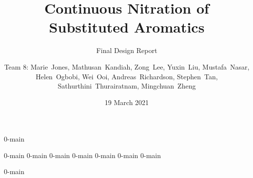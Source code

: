 \documentclass{nitroma-report}
\subtitle{Final Design Report}
\title{Continuous Nitration of Substituted Aromatics}
\author{Team 8: Marie~Jones, Mathusan~Kandiah, Zong~Lee, Yuxin~Liu, Mustafa~Nasar, Helen~Ogbobi, Wei~Ooi, Andreas~Richardson, Stephen~Tan, Sathurthini~Thurairatnam, Mingchuan~Zheng}
\date{19 March 2021}
\begin{document}
\frontmatter
\maketitle

{0-main}

\setcounter{tocdepth}{1}
\tableofcontents

\mainmatter
{0-main}
{0-main}
{0-main}
{0-main}
{0-main}
{0-main}
{0-main}

\begin{appendices}
    {0-main}
\end{appendices}
\end{document}
